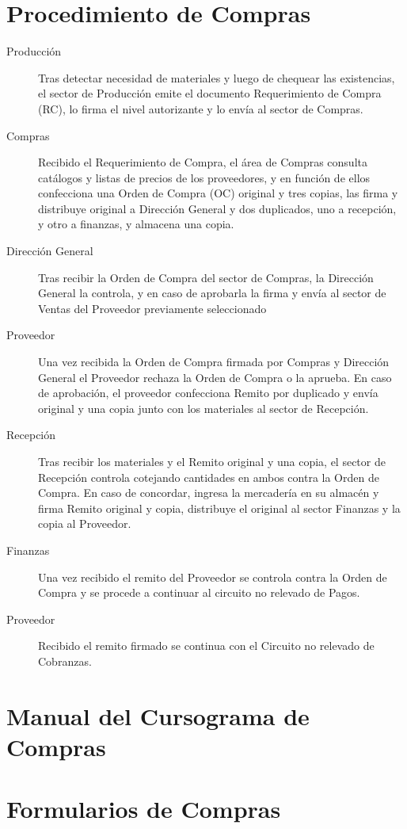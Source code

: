 \section{Procedimiento de Compras}
\begin{description}
\item[Producción] Tras detectar necesidad de materiales y luego de chequear las existencias, el sector de Producción emite el documento Requerimiento de Compra (RC), lo firma el nivel autorizante y lo envía al sector de Compras.
\item[Compras] Recibido el Requerimiento de Compra, el área de Compras consulta catálogos y listas de precios de los proveedores, y en función de ellos confecciona una Orden de Compra (OC) original y tres copias, las firma y distribuye original a Dirección General y dos duplicados, uno a recepción, y otro a finanzas, y almacena una copia.
\item [Dirección General] Tras recibir la Orden de Compra del sector de Compras, la Dirección General la controla, y en caso de aprobarla la firma y envía al sector de Ventas del Proveedor previamente seleccionado
\item [Proveedor] Una vez recibida la Orden de Compra firmada por Compras y Dirección General el Proveedor rechaza la Orden de Compra o la aprueba. En caso de aprobación, el proveedor confecciona Remito por duplicado y envía original y una copia junto con los materiales al sector de Recepción.
\item[Recepción] Tras recibir los materiales y el Remito original y una copia, el sector de Recepción controla cotejando cantidades en ambos contra la Orden de Compra. En caso de concordar, ingresa la mercadería en su almacén y firma Remito original y copia, distribuye el original al sector Finanzas y la copia al Proveedor.
\item[Finanzas] Una vez recibido el remito del Proveedor se controla contra la Orden de Compra y se procede a continuar al circuito no relevado de Pagos.
\item [Proveedor] Recibido el remito firmado se continua con el Circuito no relevado de Cobranzas.
\end{description}

\pagebreak
\section{Manual del Cursograma de Compras}


\pagebreak
\section{Formularios de Compras}
